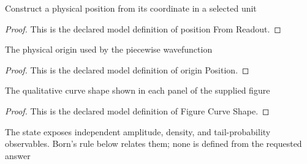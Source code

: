 \begin{definition}
  \label{def:physics:phyx-mini-0638:phyxminiproblems-problemphyxmini0638-positionfromreadout}
  Construct a physical position from its coordinate in a selected unit
\end{definition}
\begin{proof}
  This is the declared model definition of position From Readout.
\end{proof}
\begin{definition}
  \label{def:physics:phyx-mini-0638:phyxminiproblems-problemphyxmini0638-originposition}
  The physical origin used by the piecewise wavefunction
\end{definition}
\begin{proof}
  This is the declared model definition of origin Position.
\end{proof}
\begin{definition}
  \label{def:physics:phyx-mini-0638:phyxminiproblems-problemphyxmini0638-figurecurveshape}
  The qualitative curve shape shown in each panel of the supplied figure
\end{definition}
\begin{proof}
  This is the declared model definition of Figure Curve Shape.
\end{proof}
\begin{definition}
  \label{def:physics:phyx-mini-0638:phyxminiproblems-problemphyxmini0638-onedimensionalpositionstate}
  The state exposes independent amplitude, density, and tail-probability observables. Born's rule below relates them; none is defined from the requested answer
\end{definition}
